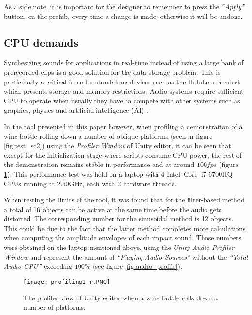 As a side note, it is important for the designer to remember to press the \textit{``Apply''} button, on the prefab, every time a change is made, otherwise it will be undone. 



\subsection{CPU demands}\label{subsec: cpu}
Synthesizing sounds for applications in real-time instead of using a large bank of prerecorded clips is a good solution for the data storage problem. This is particularly a critical issue for standalone devices such as the HoloLens headset \cite{bib:hololens} which presents storage and memory restrictions. Audio systems require sufficient \gls{CPU} to operate when usually they have to compete with other systems such as graphics, physics and artificial intelligence (AI) \cite{lloyd2011sound}. 

In the tool presented in this paper however, when profiling a demonstration of a wine bottle rolling down a number of oblique platforms (seen in figure \ref{fig:test_sc2}) using the \textit{Profiler Window} of Unity\textsuperscript{\textregistered} editor, it can be seen that except for the initialization stage where scripts consume \gls{CPU} power, the rest of the demonstration remains stable in performance and at around $100 fps$ (figure \ref{fig:profile}). This performance test was held on a laptop with 4 Intel\textregistered\ Core\texttrademark\ i7-6700HQ CPUs running at 2.60GHz, each with 2 hardware threads. 

When testing the limits of the tool, it was found that for the filter-based method a total of 16 objects can be active at the same time before the audio gets distorted. The corresponding number for the sinusoidal method is 12 objects. This could be due to the fact that the latter method completes more calculations when computing the amplitude envelopes of each impact sound. Those numbers were obtained on the laptop mentioned above, using the \textit{Unity\textsuperscript{\textregistered} Audio Profiler Window} and represent the amount of \textit{``Playing Audio Sources''} without the \textit{``Total Audio CPU''} exceeding $100\%$ (see figure \ref{fig:audio_profile}).

\begin{figure}[H]
  \centering
    \texttt{[image: profiling1\_r.PNG]}
      \caption{The profiler view of Unity\textsuperscript{\textregistered} editor when a wine bottle rolls down a number of platforms.}
      \label{fig:profile}
\end{figure}

